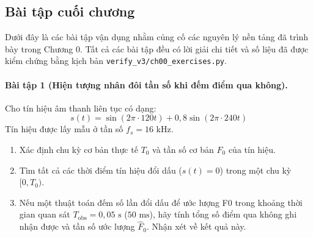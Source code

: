 \subsection*{Bài tập cuối chương}

Dưới đây là các bài tập vận dụng nhằm củng cố các nguyên lý nền tảng đã trình bày trong Chương 0. Tất cả các bài tập đều có lời giải chi tiết và số liệu đã được kiểm chứng bằng kịch bản \texttt{verify\_v3/}\allowbreak\texttt{ch00\_exercises.py}.

\paragraph{Bài tập 1 (Hiện tượng nhân đôi tần số khi đếm điểm qua không).}
Cho tín hiệu âm thanh liên tục có dạng:
\begin{equation}
    s(t) = \sin(2\pi \cdot 120 t) + 0{,}8 \sin(2\pi \cdot 240 t)
\end{equation}
Tín hiệu được lấy mẫu ở tần số $f_s = 16\text{ kHz}$.
\begin{enumerate}[label=\alph*)]
    \item Xác định chu kỳ cơ bản thực tế $T_0$ và tần số cơ bản $F_0$ của tín hiệu.
    \item Tìm tất cả các thời điểm tín hiệu đổi dấu ($s(t) = 0$) trong một chu kỳ $[0, T_0)$.
    \item Nếu một thuật toán đếm số lần đổi dấu để ước lượng F0 trong khoảng thời gian quan sát $T_{\text{obs}} = 0{,}05\text{ s}$ ($50\text{ ms}$), hãy tính tổng số điểm qua không ghi nhận được và tần số ước lượng $\hat{F}_0$. Nhận xét về kết quả này.
\end{enumerate}

